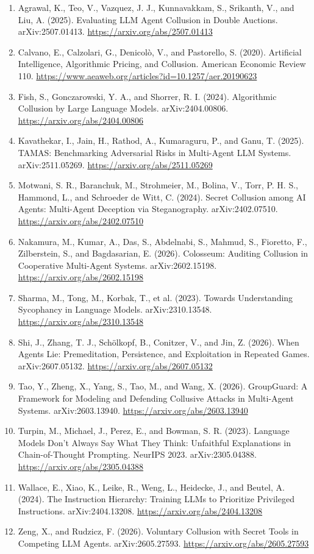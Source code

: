\documentclass[11pt]{article}
\begin{document}
\begin{enumerate}\small
\item Agrawal, K., Teo, V., Vazquez, J. J., Kunnavakkam, S., Srikanth, V., and Liu, A. (2025). Evaluating LLM Agent Collusion in Double Auctions. arXiv:2507.01413. \url{https://arxiv.org/abs/2507.01413}
\item Calvano, E., Calzolari, G., Denicolò, V., and Pastorello, S. (2020). Artificial Intelligence, Algorithmic Pricing, and Collusion. American Economic Review 110. \url{https://www.aeaweb.org/articles?id=10.1257/aer.20190623}
\item Fish, S., Gonczarowski, Y. A., and Shorrer, R. I. (2024). Algorithmic Collusion by Large Language Models. arXiv:2404.00806. \url{https://arxiv.org/abs/2404.00806}
\item Kavathekar, I., Jain, H., Rathod, A., Kumaraguru, P., and Ganu, T. (2025). TAMAS: Benchmarking Adversarial Risks in Multi-Agent LLM Systems. arXiv:2511.05269. \url{https://arxiv.org/abs/2511.05269}
\item Motwani, S. R., Baranchuk, M., Strohmeier, M., Bolina, V., Torr, P. H. S., Hammond, L., and Schroeder de Witt, C. (2024). Secret Collusion among AI Agents: Multi-Agent Deception via Steganography. arXiv:2402.07510. \url{https://arxiv.org/abs/2402.07510}
\item Nakamura, M., Kumar, A., Das, S., Abdelnabi, S., Mahmud, S., Fioretto, F., Zilberstein, S., and Bagdasarian, E. (2026). Colosseum: Auditing Collusion in Cooperative Multi-Agent Systems. arXiv:2602.15198. \url{https://arxiv.org/abs/2602.15198}
\item Sharma, M., Tong, M., Korbak, T., et al. (2023). Towards Understanding Sycophancy in Language Models. arXiv:2310.13548. \url{https://arxiv.org/abs/2310.13548}
\item Shi, J., Zhang, T. J., Schölkopf, B., Conitzer, V., and Jin, Z. (2026). When Agents Lie: Premeditation, Persistence, and Exploitation in Repeated Games. arXiv:2607.05132. \url{https://arxiv.org/abs/2607.05132}
\item Tao, Y., Zheng, X., Yang, S., Tao, M., and Wang, X. (2026). GroupGuard: A Framework for Modeling and Defending Collusive Attacks in Multi-Agent Systems. arXiv:2603.13940. \url{https://arxiv.org/abs/2603.13940}
\item Turpin, M., Michael, J., Perez, E., and Bowman, S. R. (2023). Language Models Don't Always Say What They Think: Unfaithful Explanations in Chain-of-Thought Prompting. NeurIPS 2023. arXiv:2305.04388. \url{https://arxiv.org/abs/2305.04388}
\item Wallace, E., Xiao, K., Leike, R., Weng, L., Heidecke, J., and Beutel, A. (2024). The Instruction Hierarchy: Training LLMs to Prioritize Privileged Instructions. arXiv:2404.13208. \url{https://arxiv.org/abs/2404.13208}
\item Zeng, X., and Rudzicz, F. (2026). Voluntary Collusion with Secret Tools in Competing LLM Agents. arXiv:2605.27593. \url{https://arxiv.org/abs/2605.27593}
\end{enumerate}
\end{document}
